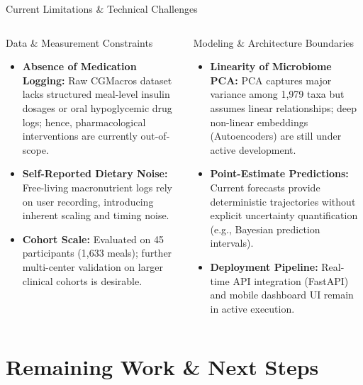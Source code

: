 \documentclass[10pt,aspectratio=169]{beamer}
\begin{document}
\begin{frame}{Current Limitations \& Technical Challenges}
    \justifying
    \begin{columns}
        \begin{alertblock}{Data & Measurement Constraints}
            \begin{itemize}
                \justifying
                \item \textbf{Absence of Medication Logging:} Raw CGMacros dataset lacks structured meal-level insulin dosages or oral hypoglycemic drug logs; hence, pharmacological interventions are currently out-of-scope.
                \item \textbf{Self-Reported Dietary Noise:} Free-living macronutrient logs rely on user recording, introducing inherent scaling and timing noise.
                \item \textbf{Cohort Scale:} Evaluated on 45 participants (1,633 meals); further multi-center validation on larger clinical cohorts is desirable.
            \end{itemize}
        \end{alertblock}

        \begin{alertblock}{Modeling & Architecture Boundaries}
            \begin{itemize}
                \justifying
                \item \textbf{Linearity of Microbiome PCA:} PCA captures major variance among 1,979 taxa but assumes linear relationships; deep non-linear embeddings (Autoencoders) are still under active development.
                \item \textbf{Point-Estimate Predictions:} Current forecasts provide deterministic trajectories without explicit uncertainty quantification (e.g., Bayesian prediction intervals).
                \item \textbf{Deployment Pipeline:} Real-time API integration (FastAPI) and mobile dashboard UI remain in active execution.
            \end{itemize}
        \end{alertblock}
    \end{columns}
\end{frame}

\section{Remaining Work & Next Steps}
\end{document}
